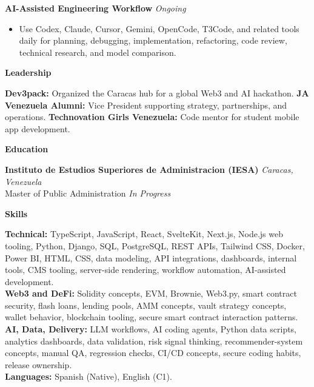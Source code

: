 \documentclass[11pt]{article}
\begin{document}
\vspace{6pt}
\textbf{AI-Assisted Engineering Workflow} \hfill \textit{Ongoing}
\begin{itemize}
    \item Use Codex, Claude, Cursor, Gemini, OpenCode, T3Code, and related tools daily for planning, debugging, implementation, refactoring, code review, technical research, and model comparison.
\end{itemize}

\vspace{7pt}
\begin{center}
    \textbf{Leadership}
\end{center}
\vspace{-4pt}
\textbf{Dev3pack:} Organized the Caracas hub for a global Web3 and AI hackathon. \textbf{JA Venezuela Alumni:} Vice President supporting strategy, partnerships, and operations. \textbf{Technovation Girls Venezuela:} Code mentor for student mobile app development.

\vspace{7pt}
\begin{center}
    \textbf{Education}
\end{center}
\vspace{-4pt}
\textbf{Instituto de Estudios Superiores de Administracion (IESA)} \hfill \textit{Caracas, Venezuela} \\
Master of Public Administration \hfill \textit{In Progress}

\vspace{7pt}
\begin{center}
    \textbf{Skills}
\end{center}
\vspace{-4pt}
\textbf{Technical:} TypeScript, JavaScript, React, SvelteKit, Next.js, Node.js web tooling, Python, Django, SQL, PostgreSQL, REST APIs, Tailwind CSS, Docker, Power BI, HTML, CSS, data modeling, API integrations, dashboards, internal tools, CMS tooling, server-side rendering, workflow automation, AI-assisted development. \\
\textbf{Web3 and DeFi:} Solidity concepts, EVM, Brownie, Web3.py, smart contract security, flash loans, lending pools, AMM concepts, vault strategy concepts, wallet behavior, blockchain tooling, secure smart contract interaction patterns. \\
\textbf{AI, Data, Delivery:} LLM workflows, AI coding agents, Python data scripts, analytics dashboards, data validation, risk signal thinking, recommender-system concepts, manual QA, regression checks, CI/CD concepts, secure coding habits, release ownership. \\
\textbf{Languages:} Spanish (Native), English (C1).
\end{document}
